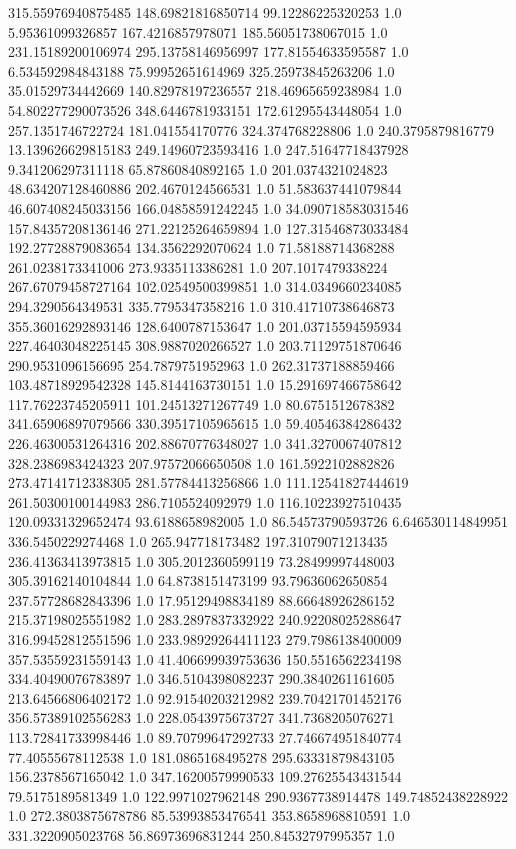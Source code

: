 315.55976940875485	148.69821816850714	99.12286225320253	1.0
5.95361099326857	167.4216857978071	185.56051738067015	1.0
231.15189200106974	295.13758146956997	177.81554633595587	1.0
6.534592984843188	75.99952651614969	325.25973845263206	1.0
35.01529734442669	140.82978197236557	218.46965659238984	1.0
54.802277290073526	348.6446781933151	172.61295543448054	1.0
257.1351746722724	181.041554170776	324.374768228806	1.0
240.3795879816779	13.139626629815183	249.14960723593416	1.0
247.51647718437928	9.341206297311118	65.87860840892165	1.0
201.0374321024823	48.634207128460886	202.4670124566531	1.0
51.583637441079844	46.607408245033156	166.04858591242245	1.0
34.090718583031546	157.84357208136146	271.22125264659894	1.0
127.31546873033484	192.27728879083654	134.3562292070624	1.0
71.58188714368288	261.0238173341006	273.9335113386281	1.0
207.1017479338224	267.67079458727164	102.02549500399851	1.0
314.0349660234085	294.3290564349531	335.7795347358216	1.0
310.41710738646873	355.36016292893146	128.6400787153647	1.0
201.03715594595934	227.46403048225145	308.9887020266527	1.0
203.71129751870646	290.9531096156695	254.7879751952963	1.0
262.31737188859466	103.48718929542328	145.8144163730151	1.0
15.291697466758642	117.76223745205911	101.24513271267749	1.0
80.6751512678382	341.65906897079566	330.39517105965615	1.0
59.40546384286432	226.46300531264316	202.88670776348027	1.0
341.3270067407812	328.2386983424323	207.97572066650508	1.0
161.5922102882826	273.47141712338305	281.57784413256866	1.0
111.12541827444619	261.50300100144983	286.7105524092979	1.0
116.10223927510435	120.09331329652474	93.6188658982005	1.0
86.54573790593726	6.646530114849951	336.5450229274468	1.0
265.947718173482	197.31079071213435	236.41363413973815	1.0
305.2012360599119	73.28499997448003	305.39162140104844	1.0
64.8738151473199	93.79636062650854	237.57728682843396	1.0
17.95129498834189	88.66648926286152	215.37198025551982	1.0
283.2897837332922	240.92208025288647	316.99452812551596	1.0
233.98929264411123	279.7986138400009	357.53559231559143	1.0
41.406699939753636	150.5516562234198	334.40490076783897	1.0
346.5104398082237	290.3840261161605	213.64566806402172	1.0
92.91540203212982	239.70421701452176	356.57389102556283	1.0
228.0543975673727	341.7368205076271	113.72841733998446	1.0
89.70799647292733	27.746674951840774	77.40555678112538	1.0
181.0865168495278	295.63331879843105	156.2378567165042	1.0
347.16200579990533	109.27625543431544	79.5175189581349	1.0
122.9971027962148	290.9367738914478	149.74852438228922	1.0
272.3803875678786	85.53993853476541	353.8658968810591	1.0
331.3220905023768	56.86973696831244	250.84532797995357	1.0
